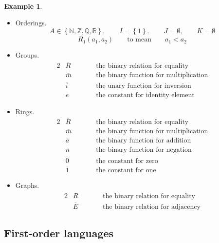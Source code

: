 \documentclass{article}
\newcommand{\N}{\mathbb{N}}
\newcommand{\Z}{\mathbb{Z}}
\newcommand{\Q}{\mathbb{Q}}
\newcommand{\R}{\mathbb{R}}
\newcommand{\rb}[1]{\left( #1 \right)}
\newcommand{\cb}[1]{\left\{ #1 \right\}}
\theoremstyle{definition}\newtheorem{definition}{Definition}[subsection]
\theoremstyle{definition}\newtheorem{remark1}[definition]{Remark}
\theoremstyle{definition}\newtheorem{example1}[definition]{Example}
\theoremstyle{definition}\newtheorem*{remark2}{Remark}
\theoremstyle{definition}\newtheorem*{example2}{Example}
\theoremstyle{definition}\newtheorem*{note}{Note}
\theoremstyle{definition}\newtheorem*{notation}{Notation}
\begin{document}
\pagebreak

\begin{example1}
\label{eg:2.1.3}
\hfill
\begin{itemize}
\item Orderings.
$$ A \in \cb{\N, \Z, \Q, \R}, \qquad I = \cb{1}, \qquad J = \emptyset, \qquad K = \emptyset $$
$$ \overline{R_1}\rb{a_1, a_2} \qquad \text{to mean} \qquad a_1 < a_2 $$
\item Groups.
\begin{alignat*}{2}
& \overline{R} & \qquad & \text{the binary relation for equality} \\
& \overline{m} & \qquad & \text{the binary function for multiplication} \\
& \overline{i} & \qquad & \text{the unary function for inversion} \\
& \overline{e} & \qquad & \text{the constant for identity element}
\end{alignat*}
\item Rings.
\begin{alignat*}{2}
& \overline{R} & \qquad & \text{the binary relation for equality} \\
& \overline{m} & \qquad & \text{the binary function for multiplication} \\
& \overline{a} & \qquad & \text{the binary function for addition} \\
& \overline{n} & \qquad & \text{the binary function for negation} \\
& \overline{0} & \qquad & \text{the constant for zero} \\
& \overline{1} & \qquad & \text{the constant for one}
\end{alignat*}
\item Graphs.
\begin{alignat*}{2}
& \overline{R} & \qquad & \text{the binary relation for equality} \\
& \overline{E} & \qquad & \text{the binary relation for adjacency}
\end{alignat*}
\end{itemize}
\end{example1}

\subsection{First-order languages}
\end{document}
